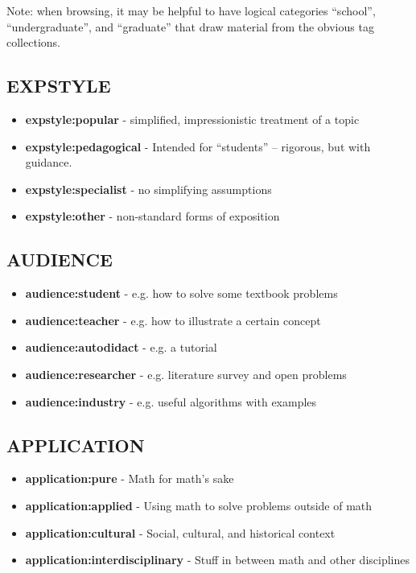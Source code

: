 \documentclass[12pt]{article}
\begin{document}
Note: when browsing, it may be helpful to have logical
categories ``school'', ``undergraduate'', and ``graduate'' that
draw material from the obvious tag collections.

\subsection*{EXPSTYLE}

\begin{itemize}
\item {\bf expstyle:popular} - simplified, impressionistic treatment of a topic
\item {\bf expstyle:pedagogical} - Intended for ``students'' -- rigorous, but with guidance.
\item {\bf expstyle:specialist} - no simplifying assumptions
\item {\bf expstyle:other} - non-standard forms of exposition
\end{itemize}

\subsection*{AUDIENCE}

\begin{itemize}
\item {\bf audience:student} - e.g. how to solve some textbook problems
\item {\bf audience:teacher} - e.g. how to illustrate a certain concept
\item {\bf audience:autodidact} - e.g. a tutorial
\item {\bf audience:researcher} - e.g. literature survey and open problems
\item {\bf audience:industry} - e.g. useful algorithms with examples
\end{itemize}

\subsection*{APPLICATION}

\begin{itemize}
\item {\bf application:pure} - Math for math's sake
\item {\bf application:applied} - Using math to solve problems outside of math
\item {\bf application:cultural} - Social, cultural, and historical context
\item {\bf application:interdisciplinary} - Stuff in between math and other disciplines
\end{itemize}
\end{document}
